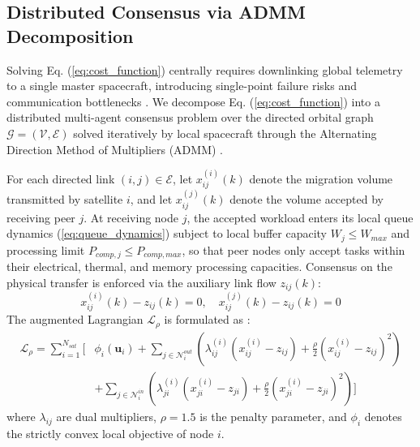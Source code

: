 \documentclass[journal]{IEEEtran}
\begin{document}
\subsection{Distributed Consensus via ADMM Decomposition}
Solving Eq. (\ref{eq:cost_function}) centrally requires downlinking global telemetry to a single master spacecraft, introducing single-point failure risks and communication bottlenecks \cite{scattolini2009architectures, christofides2013distributed, nedic2009distributed, olfatisaber2007consensus}. We decompose Eq. (\ref{eq:cost_function}) into a distributed multi-agent consensus problem over the directed orbital graph $\mathcal{G} = (\mathcal{V}, \mathcal{E})$ solved iteratively by local spacecraft through the Alternating Direction Method of Multipliers (ADMM) \cite{boyd2011distributed, giselsson2014improved}.

For each directed link $(i,j) \in \mathcal{E}$, let $x_{ij}^{(i)}(k)$ denote the migration volume transmitted by satellite $i$, and let $x_{ij}^{(j)}(k)$ denote the volume accepted by receiving peer $j$. At receiving node $j$, the accepted workload enters its local queue dynamics (\ref{eq:queue_dynamics}) subject to local buffer capacity $W_j \le W_{max}$ and processing limit $P_{comp,j} \le P_{comp,max}$, so that peer nodes only accept tasks within their electrical, thermal, and memory processing capacities. Consensus on the physical transfer is enforced via the auxiliary link flow $z_{ij}(k)$:
\begin{equation}
    x_{ij}^{(i)}(k) - z_{ij}(k) = 0, \quad x_{ij}^{(j)}(k) - z_{ij}(k) = 0
\end{equation}
The augmented Lagrangian $\mathcal{L}_{\rho}$ is formulated as \cite{boyd2011distributed}:
\begin{equation}
\begin{split}
    \mathcal{L}_{\rho} = \sum_{i=1}^{N_{sat}} \Bigg[ & \phi_i(\mathbf{u}_i) + \sum_{j \in \mathcal{N}_i^{out}} \left( \lambda_{ij}^{(i)} (x_{ij}^{(i)} - z_{ij}) + \frac{\rho}{2} (x_{ij}^{(i)} - z_{ij})^2 \right) \\
    & + \sum_{j \in \mathcal{N}_i^{in}} \left( \lambda_{ji}^{(i)} (x_{ji}^{(i)} - z_{ji}) + \frac{\rho}{2} (x_{ji}^{(i)} - z_{ji})^2 \right) \Bigg]
\end{split}
\label{eq:augmented_lagrangian}
\end{equation}
where $\lambda_{ij}$ are dual multipliers, $\rho = 1.5$ is the penalty parameter, and $\phi_i$ denotes the strictly convex local objective of node $i$.
\end{document}
